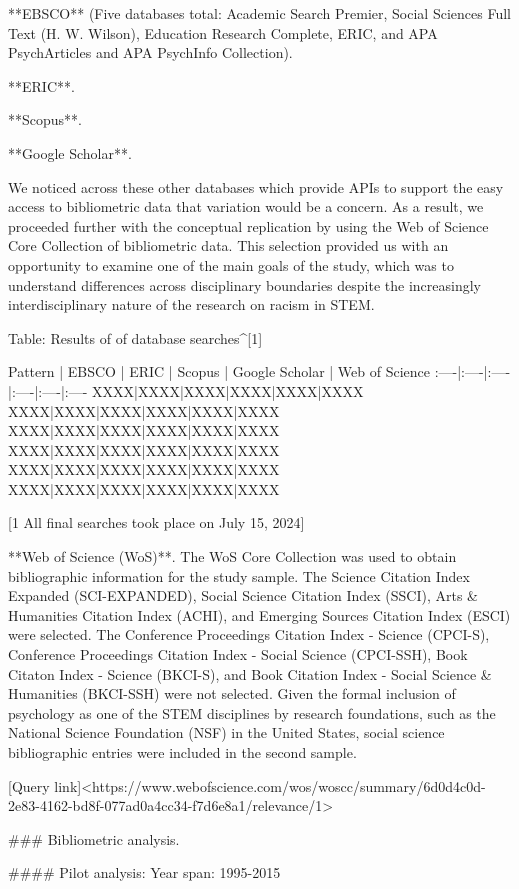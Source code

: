 {{**EBSCO** (Five databases total: Academic  Search  Premier,  Social Sciences  Full  Text  (H. W. Wilson), Education Research Complete, ERIC, and APA PsychArticles and APA PsychInfo Collection).

**ERIC**.

**Scopus**.

**Google Scholar**.

We noticed across these other databases which provide APIs to support the easy access to bibliometric data that variation would be a concern. As a result, we proceeded further with the conceptual replication by using the Web of Science Core Collection of bibliometric data. This selection provided us with an opportunity to examine one of the main goals of the study, which was to understand differences across disciplinary boundaries despite the increasingly interdisciplinary nature of the research on racism in STEM.


Table: Results of of database searches^[1]

Pattern | EBSCO | ERIC | Scopus | Google Scholar | Web of Science
:----|:----|:----|:----|:----|:----
XXXX|XXXX|XXXX|XXXX|XXXX|XXXX
XXXX|XXXX|XXXX|XXXX|XXXX|XXXX
XXXX|XXXX|XXXX|XXXX|XXXX|XXXX
XXXX|XXXX|XXXX|XXXX|XXXX|XXXX
XXXX|XXXX|XXXX|XXXX|XXXX|XXXX
XXXX|XXXX|XXXX|XXXX|XXXX|XXXX

[1 All final searches took place on July 15, 2024]

**Web of Science (WoS)**. The WoS Core Collection was used to obtain bibliographic information for the study sample. The Science Citation Index Expanded (SCI-EXPANDED), Social Science Citation Index (SSCI), Arts & Humanities Citation Index (ACHI), and Emerging Sources Citation Index (ESCI) were selected. The Conference Proceedings Citation Index - Science (CPCI-S), Conference Proceedings Citation Index - Social Science (CPCI-SSH), Book Citaton Index - Science (BKCI-S), and Book Citation Index - Social Science & Humanities (BKCI-SSH) were not selected. Given the formal inclusion of psychology as one of the STEM disciplines by research foundations, such as the National Science Foundation (NSF) in the United States, social science bibliographic entries were included in the second sample.

[Query link]{<https://www.webofscience.com/wos/woscc/summary/6d0d4c0d-2e83-4162-bd8f-077ad0a4cc34-f7d6e8a1/relevance/1>}

### Bibliometric analysis.

#### Pilot analysis: Year span: 1995-2015

}}
